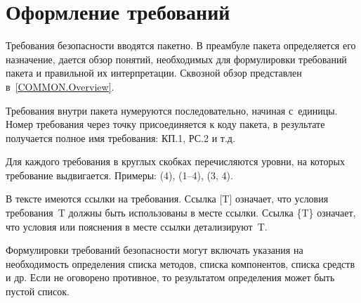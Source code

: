 \section{Оформление требований}\label{COMMON.Notation}

Требования безопасности вводятся пакетно. В преамбуле пакета определяется 
его назначение, дается обзор понятий, необходимых для формулировки 
требований пакета и правильной их интерпретации.
%
Сквозной обзор представлен в~\ref{COMMON.Overview}.

Требования внутри пакета нумеруются последовательно, начиная с~единицы.
%
Номер требования через точку присоединяется к коду пакета, 
в результате получается полное имя требования: КП.1, РС.2 и т.д.

Для каждого требования в круглых скобках перечисляются уровни, 
на которых требование выдвигается.
Примеры: (4), (1--4), (3, 4).

В тексте имеются ссылки на требования. Ссылка [T] означает,
что условия требования~T должны быть использованы в месте ссылки.
Ссылка \{T\} означает, что условия или пояснения в месте ссылки
детализируют~T. 

Формулировки требований безопасности могут включать указания на 
необходимость определения списка методов, списка компонентов, 
списка средств и др.
%
Если не оговорено противное, то результатом определения 
может быть пустой список.
